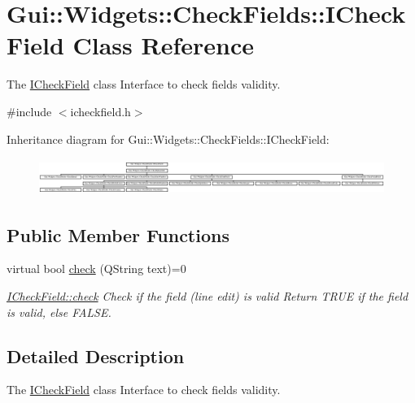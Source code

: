 \hypertarget{classGui_1_1Widgets_1_1CheckFields_1_1ICheckField}{}\section{Gui\+:\+:Widgets\+:\+:Check\+Fields\+:\+:I\+Check\+Field Class Reference}
\label{classGui_1_1Widgets_1_1CheckFields_1_1ICheckField}


The \hyperlink{classGui_1_1Widgets_1_1CheckFields_1_1ICheckField}{I\+Check\+Field} class Interface to check fields validity.  




{\ttfamily \#include $<$icheckfield.\+h$>$}

Inheritance diagram for Gui\+:\+:Widgets\+:\+:Check\+Fields\+:\+:I\+Check\+Field\+:\begin{figure}[H]
\begin{center}
\leavevmode
\includegraphics[height=1.202749cm]{d7/d93/classGui_1_1Widgets_1_1CheckFields_1_1ICheckField}
\end{center}
\end{figure}
\subsection*{Public Member Functions}
\begin{DoxyCompactItemize}
\item 
virtual bool \hyperlink{classGui_1_1Widgets_1_1CheckFields_1_1ICheckField_a818700a4a8c95eacfc39b85c74e71144}{check} (Q\+String text)=0
\begin{DoxyCompactList}\small\item\em \hyperlink{classGui_1_1Widgets_1_1CheckFields_1_1ICheckField_a818700a4a8c95eacfc39b85c74e71144}{I\+Check\+Field\+::check} Check if the field (line edit) is valid Return T\+R\+U\+E if the field is valid, else F\+A\+L\+S\+E. \end{DoxyCompactList}\end{DoxyCompactItemize}


\subsection{Detailed Description}
The \hyperlink{classGui_1_1Widgets_1_1CheckFields_1_1ICheckField}{I\+Check\+Field} class Interface to check fields validity. 

